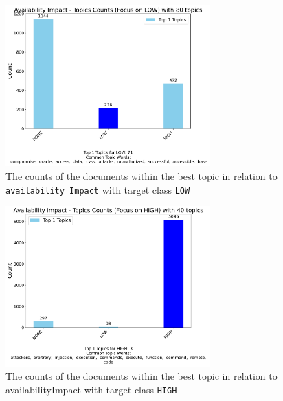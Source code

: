 \documentclass[12pt]{article}
\begin{document}
\begin{figure}[ht]
	\centering
	\includegraphics[width=0.7\textwidth]{figures/availabilityImpact/merged_top_k_topics_category_focus_counts_availabilityImpact_LOW_k1.pdf}
	\caption{The counts of the documents within the best topic in relation to \texttt{availability Impact} with target class \texttt{LOW}}
	\label{fig:availabilityImpact_60_LOW}
\end{figure}

\begin{figure}[ht]
	\centering
	\includegraphics[width=0.7\textwidth]{figures/availabilityImpact/merged_top_k_topics_category_focus_counts_availabilityImpact_HIGH_k1.pdf}
	\caption{The counts of the documents within the best topic in relation to availabilityImpact with target class \texttt{HIGH}}
	\label{fig:availabilityImpact_60_HIGH}
\end{figure}
\end{document}
